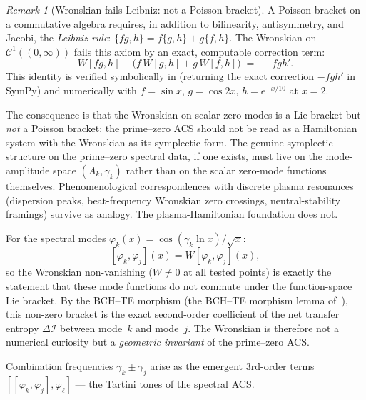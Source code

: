 \documentclass[11pt,a4paper]{article}
\theoremstyle{plain}
\theoremstyle{definition}
\theoremstyle{remark}
\newtheorem{remark}[theorem]{Remark}
\newcommand{\DI}{\Delta\mathcal{I}}
\begin{document}
\begin{remark}[Wronskian fails Leibniz: not a Poisson bracket]\label{rem:not-poisson}
A Poisson bracket on a commutative algebra requires, in addition to
bilinearity, antisymmetry, and Jacobi, the \emph{Leibniz rule}:
$\{fg, h\} = f\{g, h\} + g\{f, h\}$.  The Wronskian on
$\mathcal{C}^1((0,\infty))$ fails this axiom by an exact, computable
correction term:
\begin{equation}\label{eq:leibniz-failure}
  W[f g, h] - \bigl(f\, W[g, h] + g\, W[f, h]\bigr) \;=\; -f g h'.
\end{equation}
This identity is verified symbolically in
 (returning the exact
correction $-fgh'$ in SymPy) and numerically with
$f = \sin x$, $g = \cos 2x$, $h = e^{-x/10}$ at $x = 2$.

The consequence is that the Wronskian on scalar zero modes is a
Lie bracket but \emph{not} a Poisson bracket: the prime--zero ACS
should not be read as a Hamiltonian system with the Wronskian as
its symplectic form.  The genuine symplectic structure on the prime--zero
spectral data, if one exists, must live on the mode-amplitude space
$(A_k, \gamma_k)$ rather than on the scalar zero-mode functions
themselves.  Phenomenological correspondences with discrete plasma
resonances (dispersion peaks, beat-frequency Wronskian zero crossings,
neutral-stability framings) survive as analogy.  The plasma-Hamiltonian
foundation does not.
\end{remark}

For the spectral modes $\varphi_k(x) = \cos(\gamma_k \ln x)/\sqrt{x}$:
\[
  [\varphi_k, \varphi_j](x) = W[\varphi_k, \varphi_j](x),
\]
so the Wronskian non-vanishing ($W \neq 0$ at all tested points)
is exactly the statement that these mode functions do not commute
under the function-space Lie bracket.  By the BCH--TE morphism
(the BCH--TE morphism lemma of~\cite{Wallace2026a}), this non-zero bracket is the
exact second-order coefficient of the net transfer entropy $\DI$
between mode~$k$ and mode~$j$.  The Wronskian is therefore not a
numerical curiosity but a \emph{geometric invariant} of the prime--zero ACS.

Combination frequencies $\gamma_k \pm \gamma_j$ arise as the emergent
3rd-order terms $[[\varphi_k, \varphi_j], \varphi_\ell]$ --- the
Tartini tones of the spectral ACS.
\end{document}
